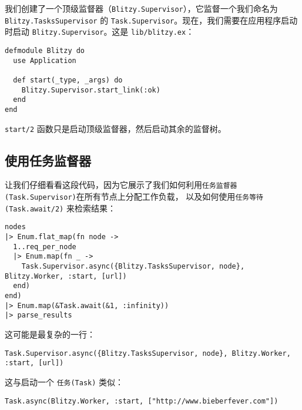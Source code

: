 我们创建了一个顶级监督器（\texttt{Blitzy.Supervisor}），它监督一个我们命名为
\texttt{Blitzy.TasksSupervisor} 的
\texttt{Task.Supervisor}。现在，我们需要在应用程序启动时启动
\texttt{Blitzy.Supervisor}。这是
\texttt{lib/blitzy.ex}：

\begin{code}{}
\begin{verbatim}
defmodule Blitzy do
  use Application

  def start(_type, _args) do
    Blitzy.Supervisor.start_link(:ok)
  end
end
\end{verbatim}
\end{code}

\texttt{start/2} 函数只是启动顶级监督器，然后启动其余的监督树。

\subsection{使用任务监督器}

让我们仔细看看这段代码，因为它展示了我们如何利用\texttt{任务监督器(Task.Supervisor)}在所有节点上分配工作负载，
以及如何使用\texttt{任务等待(Task.await/2)} 来检索结果：

\begin{code}{}
\begin{verbatim}
nodes
|> Enum.flat_map(fn node ->
  1..req_per_node
  |> Enum.map(fn _ ->
    Task.Supervisor.async({Blitzy.TasksSupervisor, node}, Blitzy.Worker, :start, [url])
  end)
end)
|> Enum.map(&Task.await(&1, :infinity))
|> parse_results
\end{verbatim}
\end{code}

这可能是最复杂的一行：

\begin{code}{}
\begin{verbatim}
Task.Supervisor.async({Blitzy.TasksSupervisor, node}, Blitzy.Worker, :start, [url])
\end{verbatim}
\end{code}

这与启动一个 \texttt{任务(Task)} 类似：

\begin{code}{}
\begin{verbatim}
Task.async(Blitzy.Worker, :start, ["http://www.bieberfever.com"])
\end{verbatim}
\end{code}

